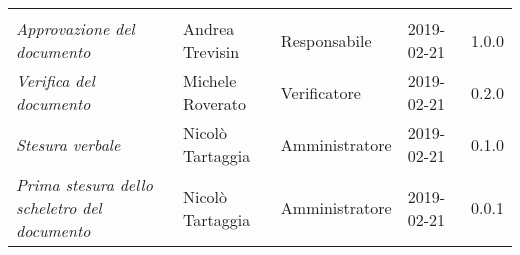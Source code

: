 \newpage 
\section*{}
\begin{table}[H]
	\centering
	\begin{tabular}{p{4cm}|C{3cm}|C{3cm}|R{2.5cm}|R{2cm}}
		
		 & & & & \\
		
		
		\emph{Approvazione del documento} & Andrea Trevisin & Responsabile & 2019-02-21 & 1.0.0 \\
		\hline
		
		\emph{Verifica del documento} & Michele Roverato & Verificatore & 2019-02-21 & 0.2.0 \\
		\hline

		\emph{Stesura verbale} & Nicolò Tartaggia & Amministratore & 2019-02-21 & 0.1.0 \\
		\hline
		
		\emph{Prima stesura dello scheletro del documento} & Nicolò Tartaggia & Amministratore & 2019-02-21 & 0.0.1 \\
		
	\end{tabular}
	
\end{table}


\clearpage